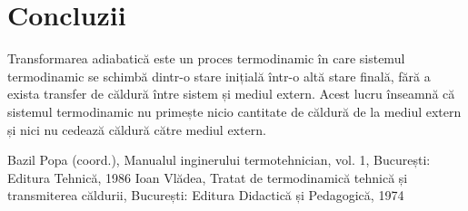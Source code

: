 \documentclass{article}
\begin{document}
\section{Concluzii}
Transformarea adiabatică este un proces termodinamic în care sistemul termodinamic se schimbă dintr-o stare inițială într-o altă stare finală, fără a exista transfer de căldură între sistem și mediul extern. Acest lucru înseamnă că sistemul termodinamic nu primește nicio cantitate de căldură de la mediul extern și nici nu cedează căldură către mediul extern.
\begin{thebibliography}{a}
Bazil Popa (coord.), Manualul inginerului termotehnician, vol. 1, București: Editura Tehnică, 1986
Ioan Vlădea, Tratat de termodinamică tehnică și transmiterea căldurii, București: Editura Didactică și Pedagogică, 1974
\end{thebibliography}
\end{document}
